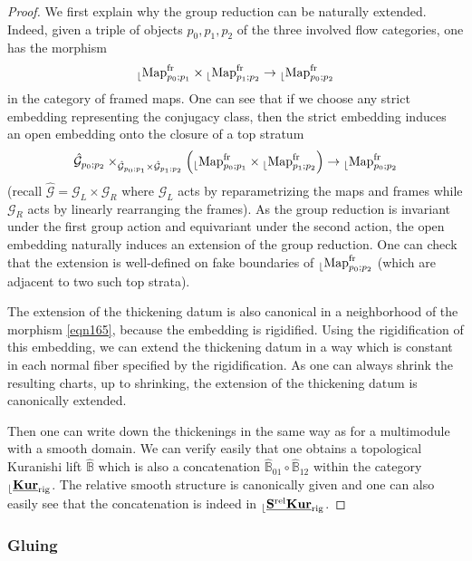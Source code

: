 \documentclass[reqno, 10pt]{amsart}
\numberwithin{equation}{section}
\numberwithin{equation}{section}
\theoremstyle{definition}
\theoremstyle{remark}
\newcommand{\beq}{\begin{equation}}
\newcommand{\eeq}{\end{equation}}
\newcommand{\beqn}{\begin{equation*}}
\newcommand{\eeqn}{\end{equation*}}
\newcommand{\mb}{\mathbb}
\newcommand{\mc}{\mathcal}
\renewcommand{\outer}{{}_{\lfloor}}
\newcommand{\uds}[1]{\underline{\smash{#1}}}
\begin{document}
\begin{proof}
We first explain why the group reduction can be naturally extended. Indeed, given a triple of objects $p_0, p_1, p_2$ of the three involved flow categories, one has the morphism
\beq\label{eqn165}
\outer {\rm Map}_{p_0; p_1}^{{\rm fr}} \times \outer {\rm Map}_{p_1; p_2}^{{\rm fr}} \to \outer {\rm Map}_{p_0; p_2}^{{\rm fr}}
\eeq
in the category of framed maps. One can see that if we choose any strict embedding representing the conjugacy class, then the strict embedding induces an open embedding onto the closure of a top stratum
\beqn
\hat {\mc G}_{p_0; p_2} \times_{\hat {\mc G}_{p_0; p_1}\times \hat {\mc G}_{p_1; p_2}} \Big( \outer {\rm Map}_{p_0; p_1}^{{\rm fr}} \times \outer {\rm Map}_{p_1; p_2}^{{\rm fr}} \Big) \to \outer {\rm Map}_{p_0; p_2}^{{\rm fr}}
\eeqn
(recall $\hat {\mc G} = {\mc G}_L \times {\mc G}_R$ where ${\mc G}_L$ acts by reparametrizing the maps and frames while ${\mc G}_R$ acts by linearly rearranging the frames). As the group reduction is invariant under the first group action and equivariant under the second action, the open embedding naturally induces an extension of the group reduction. One can check that the extension is well-defined on fake boundaries of $\outer {\rm Map}_{p_0; p_2}^{\rm fr}$ (which are adjacent to two such top strata). 

The extension of the thickening datum is also canonical in a neighborhood of the morphism \eqref{eqn165}, because the embedding is rigidified. Using the rigidification of this embedding, we can extend the thickening datum in a way which is constant in each normal fiber specified by the rigidification. As one can always shrink the resulting charts, up to shrinking, the extension of the thickening datum is canonically extended. 

Then one can write down the thickenings in the same way as for a multimodule with a smooth domain. We can verify easily that one obtains a topological Kuranishi lift $\hat {\mb B}$ which is also a concatenation $\hat {\mb B}_{01} \circ \hat {\mb B}_{12}$ within the category $\outer \uds{\bf Kur}_{\rm rig}$. The relative smooth structure is canonically given and one can also easily see that the concatenation is indeed in $\outer \uds{\bf S^{\rm rel} Kur}_{\rm rig}$.
\end{proof}


\subsubsection{Gluing}
\end{document}
